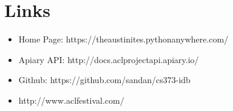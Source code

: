 \documentclass[12pt,english]{scrartcl}
\begin{document}
\section{Links}

\begin{itemize}
 \item Home Page: https://theaustinites.pythonanywhere.com/
 \item Apiary API: http://docs.aclprojectapi.apiary.io/
 \item Github: https://github.com/sandan/cs373-idb
 \item http://www.aclfestival.com/
\end{itemize}
\end{document}

